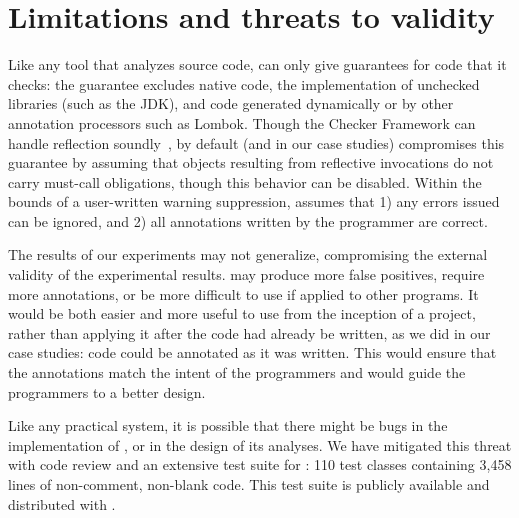 \section{Limitations and threats to validity}
\label{sec:threats}

Like any tool that analyzes source code, \Tool can only
give guarantees for code that it checks: the guarantee
excludes native code, the implementation of unchecked libraries (such as the JDK),
and code generated dynamically or by other annotation processors
such as Lombok.
Though
the Checker Framework can handle 
reflection soundly~\cite{BarrosJMVDdAE2015}, by default (and in our case studies)
\Tool compromises this guarantee
by assuming that objects resulting from reflective invocations
do not carry must-call obligations, though this behavior can
be disabled.
Within the bounds
of a user-written warning suppression, \Tool assumes that 1)
any errors issued can be ignored, and 2) all annotations
written by the programmer are correct.

The results of our experiments may not generalize, compromising the
external validity of the experimental results.
\Tool may produce more false positives, require
more annotations, or be more difficult to use if applied to other
programs.  It would be both easier and more useful to use \Tool from
the inception of a project, rather than applying it after the code had
already be written, as we did in our case studies: code could be
annotated as it was written.  This would ensure that the annotations match
the intent of the programmers and would guide the programmers to a better design.

Like any practical system, it is possible that there might
be bugs in the implementation of \Tool, or in the design of
its analyses. We have mitigated this threat with code review and an extensive
test suite for \Tool:
110 test classes containing 3,458 lines of non-comment, non-blank code.
This test suite is publicly available and distributed with \Tool.
